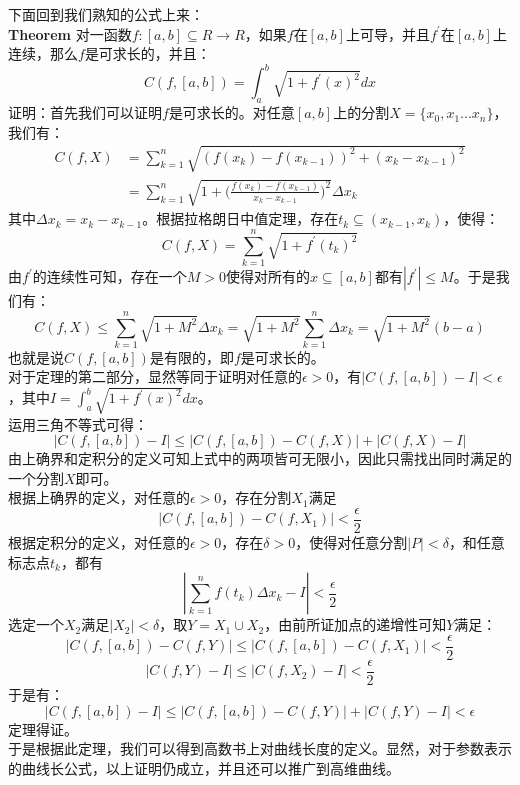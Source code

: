 \documentclass[utf8]{ctexart}
\begin{document}
\noindent 下面回到我们熟知的公式上来：\\
\textbf{Theorem} 对一函数$f:[a,b]\subseteq R\to R$，如果$f$在$[a,b]$上可导，并且$f^{'}$在$[a,b]$上连续，那么$f$是可求长的，并且：
$$
C(f,[a,b])=\int_{a}^{b}\sqrt{1+f^{'}(x)^2}dx
$$
证明：首先我们可以证明$f$是可求长的。对任意$[a,b]$上的分割$X=\{x_{0},x_{1}...x_{n}\}$，我们有：
\begin{equation}
\begin{aligned}
	C(f,X)&=\sum_{k=1}^{n}\sqrt{(f(x_{k})-f(x_{k-1}))^{2}+(x_{k}-x_{k-1})^{2}}\\&=\sum_{k=1}^{n}\sqrt{1+\bigg(\frac{f(x_{k})-f(x_{k-1})}{x_{k}-x_{k-1}}\bigg)^2}\Delta x_{k}
\end{aligned}
\end{equation}
其中$\Delta x_{k}=x_{k}-x_{k-1}$。根据拉格朗日中值定理，存在$t_{k}\subseteq (x_{k-1},x_{k})$，使得：
$$
C(f,X)=\sum_{k=1}^{n}\sqrt{1+f^{'}(t_{k})^2}
$$
由$f^{'}$的连续性可知，存在一个$M>0$使得对所有的$x\subseteq [a,b]$都有$|f^{'}|\le M$。于是我们有：
$$
C(f,X)\le \sum_{k=1}^{n}\sqrt{1+M^2}\Delta x_{k}=\sqrt{1+M^2}\sum_{k=1}^{n}\Delta x_{k}=\sqrt{1+M^2}(b-a)
$$
也就是说$C(f,[a,b])$是有限的，即$f$是可求长的。\\
对于定理的第二部分，显然等同于证明对任意的$\epsilon>0$，有$|C(f,[a,b])-I|<\epsilon$，其中$I=\int_{a}^{b}\sqrt{1+f^{'}(x)^2}dx$。\\
运用三角不等式可得：
$$
|C(f,[a,b])-I|\le |C(f,[a,b])-C(f,X)|+|C(f,X)-I|
$$
由上确界和定积分的定义可知上式中的两项皆可无限小，因此只需找出同时满足的一个分割$X$即可。\\
根据上确界的定义，对任意的$\epsilon>0$，存在分割$X_1$满足
$$
|C(f,[a,b])-C(f,X_1)|<\frac{\epsilon}{2}
$$
根据定积分的定义，对任意的$\epsilon>0$，存在$\delta>0$，使得对任意分割$|P|<\delta$，和任意标志点$t_k$，都有
$$
|\sum_{k=1}^{n}f(t_k)\Delta x_k-I|<\frac{\epsilon}{2}
$$
选定一个$X_2$满足$|X_2|<\delta$，取$Y=X_1\cup X_2$，由前所证加点的递增性可知$Y$满足：
$$
|C(f,[a,b])-C(f,Y)|\le |C(f,[a,b])-C(f,X_1)|<\frac{\epsilon}{2}
$$
$$
|C(f,Y)-I|\le |C(f,X_2)-I|<\frac{\epsilon}{2}
$$
于是有：
$$
|C(f,[a,b])-I|\le |C(f,[a,b])-C(f,Y)|+|C(f,Y)-I|<\epsilon
$$
定理得证。\\
于是根据此定理，我们可以得到高数书上对曲线长度的定义。显然，对于参数表示的曲线长公式，以上证明仍成立，并且还可以推广到高维曲线。
\end{document}
